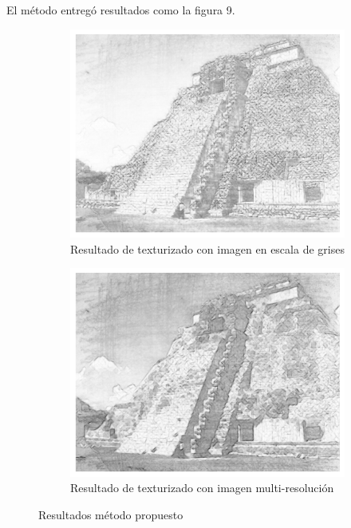 \documentclass[letterpaper, 10 pt, conference]{ieeeconf}  %
\begin{document}
El método entregó resultados como la figura 9.
\begin{figure}[H]
\centering
    \begin{subfigure}{0.45\linewidth}
\includegraphics[width=\linewidth, scale=0.05]{images/res_gray.png} 
    \caption{Resultado de texturizado con imagen en escala de grises}
\label{fig:1a}
    \end{subfigure}\hfill
    \begin{subfigure}{0.45\linewidth}
\includegraphics[width=\linewidth, scale=0.1]{images/res_mres.png}
    \caption{Resultado de texturizado con imagen multi-resolución}
\label{dib-hist}
    \end{subfigure}
\caption{Resultados método propuesto}
\label{porfavor}
    \end{figure}
    
\end{document}
